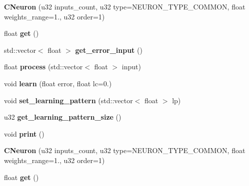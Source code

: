 \begin{DoxyCompactItemize}
\item 
\hypertarget{classCNeuron_ae9f32d41d2bb7b9683a440e038f5b6f6}{{\bfseries C\-Neuron} (u32 inputs\-\_\-count, u32 type=N\-E\-U\-R\-O\-N\-\_\-\-T\-Y\-P\-E\-\_\-\-C\-O\-M\-M\-O\-N, float weights\-\_\-range=1., u32 order=1)}\label{classCNeuron_ae9f32d41d2bb7b9683a440e038f5b6f6}

\item 
\hypertarget{classCNeuron_af97048090878729c7d99dcb8363e61ff}{float {\bfseries get} ()}\label{classCNeuron_af97048090878729c7d99dcb8363e61ff}

\item 
\hypertarget{classCNeuron_a50f6d18278e8fa7cd4d189657b019989}{std\-::vector$<$ float $>$ {\bfseries get\-\_\-error\-\_\-input} ()}\label{classCNeuron_a50f6d18278e8fa7cd4d189657b019989}

\item 
\hypertarget{classCNeuron_a0b9c5ff02de4dae0f2bc98d81810d597}{float {\bfseries process} (std\-::vector$<$ float $>$ input)}\label{classCNeuron_a0b9c5ff02de4dae0f2bc98d81810d597}

\item 
\hypertarget{classCNeuron_a64eb412ce09f2f59077281d86a085303}{void {\bfseries learn} (float error, float lc=0.)}\label{classCNeuron_a64eb412ce09f2f59077281d86a085303}

\item 
\hypertarget{classCNeuron_a0bcb7781406fa9a282eaafe4b154b5b6}{void {\bfseries set\-\_\-learning\-\_\-pattern} (std\-::vector$<$ float $>$ lp)}\label{classCNeuron_a0bcb7781406fa9a282eaafe4b154b5b6}

\item 
\hypertarget{classCNeuron_ad3cfde2fc3314e525345e8ec6595b1cb}{u32 {\bfseries get\-\_\-learning\-\_\-pattern\-\_\-size} ()}\label{classCNeuron_ad3cfde2fc3314e525345e8ec6595b1cb}

\item 
\hypertarget{classCNeuron_a37db8b58d3d3cd00c2cdc12b0a7466b3}{void {\bfseries print} ()}\label{classCNeuron_a37db8b58d3d3cd00c2cdc12b0a7466b3}

\item 
\hypertarget{classCNeuron_ae9f32d41d2bb7b9683a440e038f5b6f6}{{\bfseries C\-Neuron} (u32 inputs\-\_\-count, u32 type=N\-E\-U\-R\-O\-N\-\_\-\-T\-Y\-P\-E\-\_\-\-C\-O\-M\-M\-O\-N, float weights\-\_\-range=1., u32 order=1)}\label{classCNeuron_ae9f32d41d2bb7b9683a440e038f5b6f6}

\item 
\hypertarget{classCNeuron_af97048090878729c7d99dcb8363e61ff}{float {\bfseries get} ()}\label{classCNeuron_af97048090878729c7d99dcb8363e61ff}


\end{DoxyCompactItemize}
